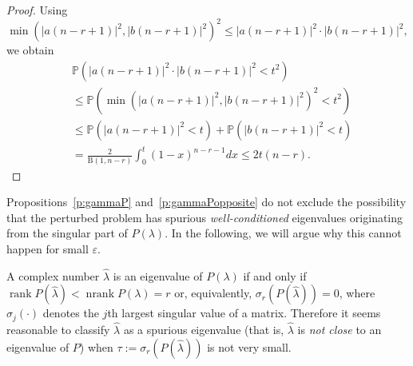 \documentclass[12pt]{article}
\newcommand{\Bfun}{\mathrm{B}}
\DeclareMathOperator{\nrank}{nrank}
\DeclareMathOperator{\rank}{rank}
\begin{document}
\begin{proof}
    Using
\begin{equation*}
    \min \left( |a(n-r+1)|^2, |b(n-r+1)|^2 \right)^2 \leq |a(n-r+1)|^2\cdot |b(n-r+1)|^2,
\end{equation*}
we obtain
\begin{align*}
    & \mathbb{P}(|a(n-r+1)|^2\cdot |b(n-r+1)|^2<t^2)\\
    &\leq \mathbb{P}(\min \left( |a(n-r+1)|^2, |b(n-r+1)|^2 \right)^2 < t^2) \\
    &\leq \mathbb{P}( |a(n-r+1)|^2< {t}) + \mathbb{P}( |b(n-r+1)|^2< {t})\\
    &= \frac{2}{\Bfun(1,n-r)}\int^{{t}}_{0} (1-x)^{n-r-1}dx \le 2 t (n-r).
\end{align*}
\end{proof}
Propositions~\ref{p:gammaP} and~\ref{p:gammaPopposite} do not exclude the possibility that the perturbed problem has spurious \emph{well-conditioned} eigenvalues originating from the singular part of $P(\lambda)$. In the following, we will argue why this cannot happen for small $\varepsilon$.

A complex number $\hat{\lambda}$ is an eigenvalue of $P(\lambda)$ if and only if $\rank P(\hat{\lambda}) < \nrank P(\lambda) = r$ or, equivalently, $\sigma_r(P(\hat{\lambda})) = 0$, where $\sigma_j(\cdot)$ denotes the $j$th largest singular value of a matrix. Therefore it seems reasonable to classify $\hat{\lambda}$ as a spurious eigenvalue (that is, $\hat{\lambda}$ is \emph{not close} to an eigenvalue of $P$) when $\tau := \sigma_r(P(\hat{\lambda}))$ is not very small. 
\end{document}

